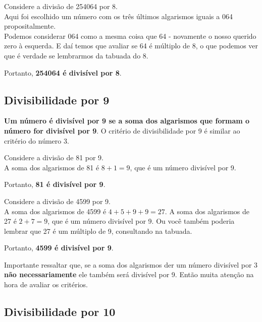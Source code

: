 \begin{exemplo}
    Considere a divisão de 254064 por 8.\\

    Aqui foi escolhido um número com os três últimos algarismos iguais a 064 propositalmente.\\
    
    Podemos considerar 064 como a mesma coisa que 64 - novamente o nosso querido zero à esquerda. E daí temos que avaliar se 64 é múltiplo de 8, o que podemos ver que é verdade se lembrarmos da tabuada do 8.

    Portanto, \textbf{254064 é divisível por 8}.
\end{exemplo}

\subsection{Divisibilidade por 9}
\textbf{Um número é divisível por 9 se a soma dos algarismos que formam o número for divisível por 9}. O critério de divisibilidade por 9 é similar ao critério do número 3. 

\begin{exemplo}
    Considere a divisão de 81 por 9.\\

    A soma dos algarismos de 81 é \(8+1=9\), que é um número divisível por 9. 

    Portanto, \textbf{81 é divisível por 9}.
\end{exemplo}

\begin{exemplo}
    Considere a divisão de 4599 por 9.\\

    A soma dos algarismos de 4599 é \(4+5+9+9=27\). A soma dos algarismos de 27 é \(2+7=9\), que é um número divisível por 9. Ou você também poderia lembrar que 27 é um múltiplo de 9, consultando na tabuada. 

    Portanto, \textbf{4599 é divisível por 9}.
\end{exemplo}

Importante ressaltar que, se a soma dos algarismos der um número divisível por 3 \textbf{não necessariamente} ele também será divisível por 9. Então muita atenção na hora de avaliar os critérios.

\subsection{Divisibilidade por 10}

